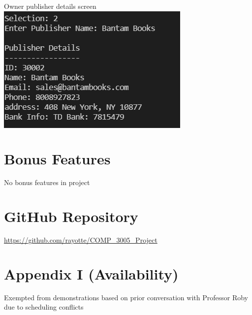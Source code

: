 \documentclass[Project Report]{article}
\begin{document}
Owner publisher details screen\\
{\centering \includegraphics[width=\textwidth]{../Screenshots/Owner_pub_details.PNG}}

\section{Bonus Features}
No bonus features in project

\section{GitHub Repository}
\url{https://github.com/rayotte/COMP_3005_Project}

\section{Appendix I (Availability)}
Exempted from demonstrations based on prior conversation with Professor Roby due to scheduling conflicts
\end{document}
